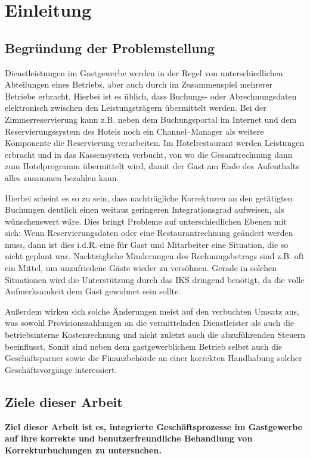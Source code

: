 \section{Einleitung} %
\label{sec:einleitung}

\subsection{Begründung der Problemstellung} %
\label{sub:begrundung_der_problemstellung}
Dienstleistungen im Gastgewerbe werden in der Regel von unterschiedlichen Abteilungen eines Betriebs, aber auch durch im Zusammenspiel mehrerer Betriebe erbracht. Hierbei ist es üblich, dass Buchungs- oder Abrechnungsdaten elektronisch zwischen den Leistungsträgern übermittelt werden. Bei der Zimmerreservierung kann z.B. neben dem Buchungsportal im Internet und dem Reservierungssystem des Hotels noch ein Channel–Manager als weitere Komponente die Reservierung verarbeiten. Im Hotelrestaurant werden Leistungen erbracht und in das Kassensystem verbucht, von wo die Gesamtrechnung dann zum Hotelprogramm übermittelt wird, damit der Gast am Ende des Aufenthalts alles zusammen bezahlen kann.

Hierbei scheint es so zu sein, dass nachträgliche Korrekturen an den getätigten Buchungen deutlich einen weitaus geringeren Integrationsgrad aufweisen, als wünschenswert wäre. Dies bringt Probleme auf unterschiedlichen Ebenen mit sich: Wenn Reservierungsdaten oder eine Restaurantrechnung geändert werden muss, dann ist dies i.d.R. eine für Gast und Mitarbeiter eine Situation, die so nicht geplant war. Nachträgliche Minderungen des Rechnungsbetrags sind z.B. oft ein Mittel, um unzufriedene Gäste wieder zu versöhnen. Gerade in solchen Situationen wird die Unterstützung durch das \ac{IKS} dringend benötigt, da die volle Aufmerksamkeit dem Gast gewidmet sein sollte.

Außerdem wirken sich solche Änderungen meist auf den verbuchten Umsatz aus, was sowohl  Provisionszahlungen an die vermittelnden Dienstleister als auch die betriebsinterne Kostenrechnung und nicht zuletzt auch die abzuführenden Steuern beeinflusst. Somit sind neben dem gastgewerblichem Betrieb selbst auch die Geschäftsparner sowie die Finanzbehörde an einer korrekten Handhabung solcher Geschäftsvorgänge interessiert.

\subsection{Ziele dieser Arbeit} %
\label{sub:ziele_dieser_arbeit}
\textbf{Ziel dieser Arbeit ist es, integrierte Geschäftsprozesse im Gastgewerbe auf ihre korrekte und benutzerfreundliche Behandlung von Korrekturbuchungen zu untersuchen.}

